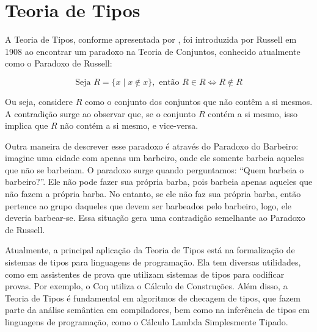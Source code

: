 \chapter{Teoria de Tipos} \label{ch:type-theory}

A Teoria de Tipos, conforme apresentada por \cite{COQUAND2022}, foi introduzida por Russell em 1908 ao encontrar um paradoxo na Teoria de Conjuntos, conhecido atualmente como o Paradoxo de Russell:

\begin{equation} \label{eq:russell-paradox}
  \text{Seja } R = \{ x \mid x \notin x \}, \text{ então } R \in R \iff R \notin R
\end{equation}

Ou seja, considere $R$ como o conjunto dos conjuntos que não contêm a si mesmos.
A contradição surge ao observar que, se o conjunto $R$ contém a si mesmo, isso implica que $R$ não contém a si mesmo, e vice-versa.

Outra maneira de descrever esse paradoxo é através do Paradoxo do Barbeiro: imagine uma cidade com apenas um barbeiro, onde ele somente barbeia aqueles que não se barbeiam.
O paradoxo surge quando perguntamos: ``Quem barbeia o barbeiro?''.
Ele não pode fazer sua própria barba, pois barbeia apenas aqueles que não fazem a própria barba.
No entanto, se ele não faz sua própria barba, então pertence ao grupo daqueles que devem ser barbeados pelo barbeiro, logo, ele deveria barbear-se.
Essa situação gera uma contradição semelhante ao Paradoxo de Russell.

Atualmente, a principal aplicação da Teoria de Tipos está na formalização de sistemas de tipos para linguagens de programação.
Ela tem diversas utilidades, como em assistentes de prova que utilizam sistemas de tipos para codificar provas.
Por exemplo, o Coq \cite{COQUAND1998} utiliza o Cálculo de Construções.
Além disso, a Teoria de Tipos é fundamental em algoritmos de checagem de tipos, que fazem parte da análise semântica em compiladores, bem como na inferência de tipos em linguagens de programação, como o Cálculo Lambda Simplesmente Tipado.


